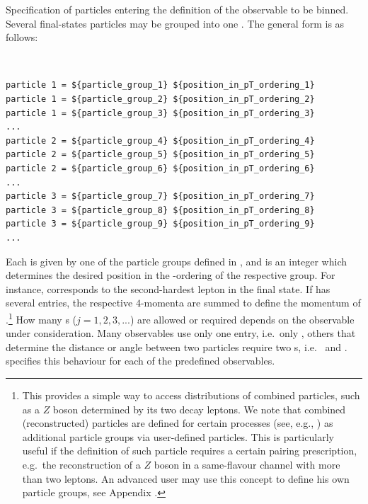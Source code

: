 \documentclass[english,11pt]{article}
\begin{document}
\quad Specification of particles entering the definition of the observable to be binned. Several final-states particles may 
be grouped into one . The general form is as follows:
\lstset{basicstyle=\scriptsize, frame=single}
{\tt
\begin{lstlisting}
particle 1 = ${particle_group_1} ${position_in_pT_ordering_1}
particle 1 = ${particle_group_2} ${position_in_pT_ordering_2}
particle 1 = ${particle_group_3} ${position_in_pT_ordering_3}
...
particle 2 = ${particle_group_4} ${position_in_pT_ordering_4}
particle 2 = ${particle_group_5} ${position_in_pT_ordering_5}
particle 2 = ${particle_group_6} ${position_in_pT_ordering_6}
...
particle 3 = ${particle_group_7} ${position_in_pT_ordering_7}
particle 3 = ${particle_group_8} ${position_in_pT_ordering_8}
particle 3 = ${particle_group_9} ${position_in_pT_ordering_9}
...
\end{lstlisting}
}
Each  is given by one of the particle groups defined in , and 
 is an integer which determines the desired position in the \pt{}-ordering of the respective group.
For instance,  corresponds to the second-hardest lepton in the final state.
If  has several entries, the respective $4$-momenta are summed to define the momentum 
of .\footnote{This provides a simple way to access distributions of combined particles, such as 
a $Z$ boson determined by its two decay leptons. We note that combined (reconstructed) particles are defined for certain processes (see, e.g., ) as additional 
particle groups via user-defined particles. This is particularly useful if the definition of such particle requires a certain pairing prescription, 
e.g.\ the reconstruction of a $Z$ boson in a same-flavour channel with more than two leptons. An advanced user may use this concept to define his own particle groups, see Appendix .} How many s ($j=1,2,3,...$) are allowed or required depends on the observable under consideration. Many observables 
use only one  entry, i.e.\ only , others that determine the distance or angle between two particles require 
two s, i.e.\  and .  specifies this behaviour for each 
of the predefined observables.
\end{document}
